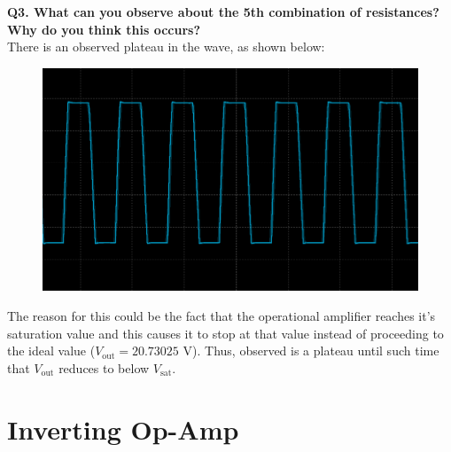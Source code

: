 \documentclass[a4paper,12pt,oneside, tikz]{book}
\begin{document}
\begin{tcolorbox}
\textbf{Q3. What can you observe about the 5th combination of resistances? Why do you think this occurs?} \\
There is an observed plateau in the wave, as shown below:
\begin{figure}[H]
    \centering
    \includegraphics[width=120mm]{./images/plateau.png}
\end{figure}

The reason for this could be the fact that the operational amplifier reaches it's saturation value and this causes it to stop at that value instead of proceeding to the ideal value ($V_\text{out} = 20.73025$ V). Thus, observed is a plateau until such time that $V_\text{out}$ reduces to below $V_\text{sat}$.

\end{tcolorbox}


\chapter{Inverting Op-Amp}
\end{document}
